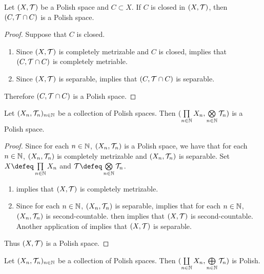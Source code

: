\documentclass{book}
\begin{document}
\begin{ex} 
	Let $(X, \mathcal{T})$ be a Polish space and $C \subset X$. If $C$ is closed in $(X, \mathcal{T})$, then $(C, \mathcal{T} \cap C)$ is a Polish space.
\end{ex}

\begin{proof}
	Suppose that $C$ is closed. 
	\begin{enumerate}
		\item Since $(X, \mathcal{T})$ is completely metrizable and $C$ is closed,  implies that $(C, \mathcal{T} \cap C)$ is completely metriable.  
		\item Since $(X, \mathcal{T})$ is separable,  implies that $(C, \mathcal{T} \cap C)$ is separable.
	\end{enumerate}
	Therefore $(C, \mathcal{T} \cap C)$ is a Polish space.
\end{proof}

\begin{ex} 
	Let $(X_n, \mathcal{T}_n)_{n \in \mathbb{N}}$ be a collection of Polish spaces. Then $(\prod\limits_{n \in \mathbb{N}} X_n, \bigotimes\limits_{n \in \mathbb{N}} \mathcal{T}_n)$ is a Polish space.  
\end{ex}

\begin{proof} Since for each $n \in \mathbb{N}$, $(X_n, \mathcal{T}_n)$ is a Polish space, we have that for each $n \in \mathbb{N}$, $(X_n, \mathcal{T}_n)$ is completely metrizable and $(X_n, \mathcal{T}_n)$ is separable. Set $X \defeq \prod\limits_{n \in \N} X_n$ and $\MT \defeq \bigotimes\limits_{n \in \N} \MT_{n}$. 
	\begin{enumerate}
		\item {} implies that $(X, \mathcal{T})$ is completely metrizable. 
		\item Since for each $n \in \mathbb{N}$, $(X_n, \mathcal{T}_n)$ is separable,  implies that for each $n \in \mathbb{N}$, $(X_n, \mathcal{T}_n)$ is second-countable.  then implies that $(X, \mathcal{T})$ is second-countable. Another application of  implies that $(X, \mathcal{T})$ is separable. 
	\end{enumerate}
	Thus $(X, \mathcal{T})$ is a Polish space.
\end{proof}

\begin{ex} 
	Let $(X_n, \mathcal{T}_n)_{n \in \mathbb{N}}$ be a collection of Polish spaces. Then $(\coprod\limits_{n \in \mathbb{N}} X_n, \bigoplus\limits_{n \in \mathbb{N}} \mathcal{T}_n)$ is Polish.  
\end{ex}
\end{document}
